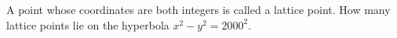 A point whose coordinates are both integers is called a lattice point.  How many lattice points lie on the hyperbola $x^2-y^2=2000^2.$